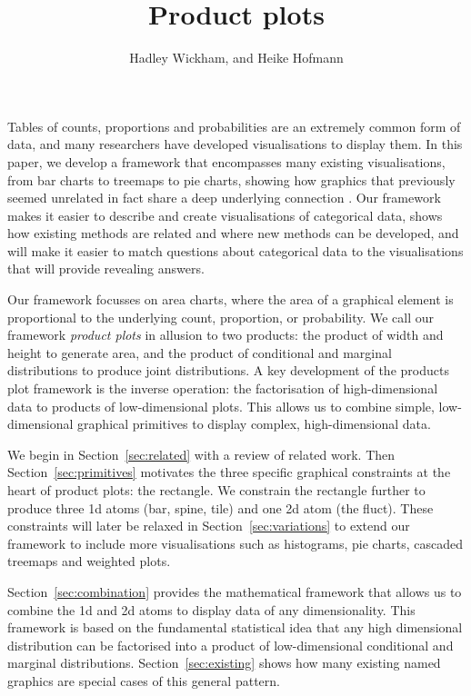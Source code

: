 \documentclass[journal]{vgtc}
\title{Product plots}
\author{Hadley Wickham, and Heike Hofmann}
\begin{document}
\maketitle

Tables of counts, proportions and probabilities are an extremely common form of data, and many researchers have developed visualisations to display them. In this paper, we develop a framework that encompasses many existing visualisations, from bar charts to treemaps to pie charts, showing how graphics that previously seemed unrelated in fact share a deep underlying connection \citep{cox:1978}. Our framework makes it easier to describe and create visualisations of categorical data, shows how existing methods are related and where new methods can be developed, and will make it easier to match questions about categorical data to the visualisations that will provide revealing answers.

Our framework focusses on area charts, where the area of a graphical element is proportional to the underlying count, proportion, or probability. We call our framework \emph{product plots} in allusion to two products: the product of width and height to generate area, and the product of conditional and marginal distributions to produce joint distributions. A key development of the products plot framework is the inverse operation: the factorisation of high-dimensional data to products of low-dimensional plots. This allows us to  combine simple, low-dimensional graphical primitives to display complex, high-dimensional data.

We begin in Section~\ref{sec:related} with a review of related work. Then Section~\ref{sec:primitives} motivates the three specific graphical constraints at the heart of product plots: the rectangle. We constrain the rectangle further to produce three 1d atoms (bar, spine, tile) and one 2d atom (the fluct). These constraints will later be relaxed in Section~\ref{sec:variations} to extend our framework to include more visualisations such as histograms, pie charts, cascaded treemaps and weighted plots.

Section~\ref{sec:combination} provides the mathematical framework that allows us to combine the 1d and 2d atoms to display data of any dimensionality. This framework is based on the fundamental statistical idea that any high dimensional distribution can be factorised into a product of low-dimensional conditional and marginal distributions. Section~\ref{sec:existing} shows how many existing named graphics are special cases of this general pattern.
\end{document}
